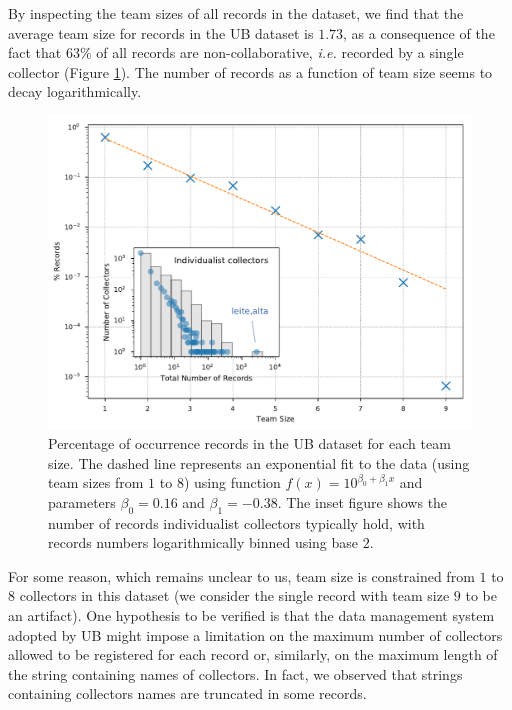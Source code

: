 By inspecting the team sizes of all records in the dataset, we find that the average team size for records in the UB dataset is $1.73$, as a consequence of the fact that $63\%$ of all records are non-collaborative, \textit{i.e.} recorded by a single collector (Figure \ref{fig:ub_team_sizes}).
The number of records as a function of team size seems to decay logarithmically.
\begin{figure}[!ht]
  	\centering
    \includegraphics[width=0.9\linewidth]{figures/casestudy_ub/team_sizes.pdf}
    \caption[Percentage of occurrence records in the UB dataset for each team size.]{ Percentage of occurrence records in the UB dataset for each team size. The dashed line represents an exponential fit to the data (using team sizes from $1$ to $8$) using function $f(x) = 10^{\beta_0 + \beta_1 x}$ and parameters $\beta_0=0.16$ and $\beta_1=-0.38$. The inset figure shows the number of records individualist collectors typically hold, with records numbers logarithmically binned using base $2$. }
    \label{fig:ub_team_sizes}
\end{figure}
%
For some reason, which remains unclear to us, team size is constrained from $1$ to $8$ collectors in this dataset (we consider the single record with team size $9$ to be an artifact).
One hypothesis to be verified is that the data management system adopted by UB might impose a limitation on the maximum number of collectors allowed to be registered for each record or, similarly, on the maximum length of the string containing names of collectors. 
In fact, we observed that strings containing collectors names are truncated in some records.

